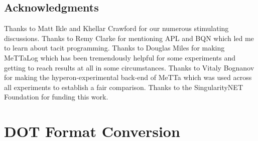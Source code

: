 \documentclass[]{report}
\begin{document}
\section{Acknowledgments}
Thanks to Matt Ikle and Khellar Crawford for our numerous stimulating
discussions.  Thanks to Remy Clarke for mentioning APL and BQN which
led me to learn about tacit programming.  Thanks to Douglas Miles for
making \mbox{MeTTaLog} which has been tremendously helpful for some
experiments and getting to reach results at all in some circumstances.
Thanks to Vitaly Bognanov for making the hyperon-experimental back-end
of MeTTa which was used across all experiments to establish a fair
comparison.  Thanks to the SingularityNET Foundation for funding this
work.

\appendix
\chapter{DOT Format Conversion}
\label{apdx:dot}

 
\end{document}
